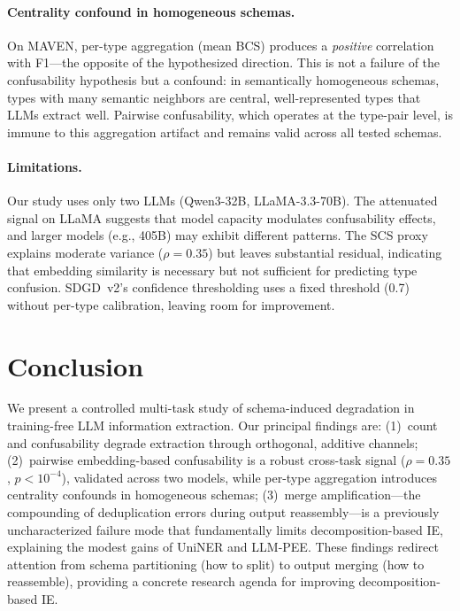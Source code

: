 \documentclass[11pt,a4paper]{article}
\begin{document}
\paragraph{Centrality confound in homogeneous schemas.}
On MAVEN, per-type aggregation (mean BCS) produces a \emph{positive} correlation with F1---the opposite of the hypothesized direction. This is not a failure of the confusability hypothesis but a confound: in semantically homogeneous schemas, types with many semantic neighbors are central, well-represented types that LLMs extract well. Pairwise confusability, which operates at the type-pair level, is immune to this aggregation artifact and remains valid across all tested schemas.

\paragraph{Limitations.}
Our study uses only two LLMs (Qwen3-32B, LLaMA-3.3-70B). The attenuated signal on LLaMA suggests that model capacity modulates confusability effects, and larger models (e.g., 405B) may exhibit different patterns. The SCS proxy explains moderate variance ($\rho = 0.35$) but leaves substantial residual, indicating that embedding similarity is necessary but not sufficient for predicting type confusion. SDGD~v2's confidence thresholding uses a fixed threshold (0.7) without per-type calibration, leaving room for improvement.

\section{Conclusion}

We present a controlled multi-task study of schema-induced degradation in training-free LLM information extraction. Our principal findings are: (1)~count and confusability degrade extraction through orthogonal, additive channels; (2)~pairwise embedding-based confusability is a robust cross-task signal ($\rho = 0.35$, $p < 10^{-4}$), validated across two models, while per-type aggregation introduces centrality confounds in homogeneous schemas; (3)~merge amplification---the compounding of deduplication errors during output reassembly---is a previously uncharacterized failure mode that fundamentally limits decomposition-based IE, explaining the modest gains of UniNER and LLM-PEE. These findings redirect attention from schema partitioning (how to split) to output merging (how to reassemble), providing a concrete research agenda for improving decomposition-based IE.
\end{document}
